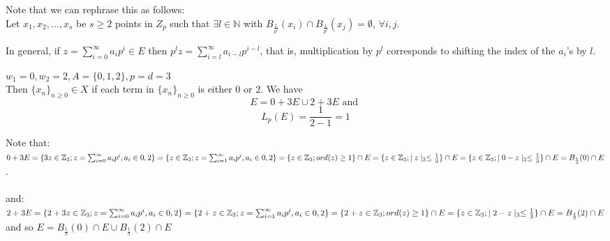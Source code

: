 \begin{framed}
Note that we can rephrase this as follows:\\ Let $x_1,x_2,\ldots,x_s$ be $s \geq 2$ points in $Z_p$ such that $\exists l \in \mathbb{N}$ with $B_{\frac{1}{p^l}}(x_i) \cap B_{\frac{1}{p^l}}(x_j) = \emptyset$, $\forall i,j$.

In general, if $z=\sum_{i=0}^\infty a_ip^i \in E$ then $p^lz =\sum_{i=l}^\infty a_{i-l}p^{i-l} $, that is, multiplication by $p^l$ corresponds to shifting the index of the $a_i$'s by $l$.
\end{framed}	
\begin{example}
$w_1=0, w_2=2,  A=\{0,1,2\}, p=d=3$\\
Then $\{x_n\}_{n\geq0} \in X$ if each term in  $\{x_n\}_{n\geq0}$ is either $0$ or $2$. We have \[E=0 + 3E \cup 2 + 3E \text{ and }\]  \[L_p(E) = \frac{1}{2-1} =1\] 

Note that:\newline $0 + 3E = \{3z \in \mathbb{Z}_3; z = \sum_{i=0}^\infty a_ip^i, a_i \in {0,2}\} =\\
\{z \in \mathbb{Z}_3; z = \sum_{i=1}^\infty a_ip^i, a_i \in {0,2}\} =\\
\{z \in \mathbb{Z}_3; ord(z) \geq 1 \} \cap E=\\
\{z \in \mathbb{Z}_3; \mid z \mid_3 \leq \frac{1}{3}\} \cap E = \\
\{z \in \mathbb{Z}_3; \mid 0- z \mid_3 \leq \frac{1}{3}\} \cap E = B_{\frac{1}{3}}(0) \cap E$.
\\\\and:\\ 
$2 + 3E = \{2 + 3z \in \mathbb{Z}_3; z = \sum_{i=0}^\infty a_ip^i, a_i \in {0,2}\} =\\
\{2 + z \in \mathbb{Z}_3; z = \sum_{i=1}^\infty a_ip^i, a_i \in {0,2}\} =\\
\{2 + z \in \mathbb{Z}_3; ord(z) \geq 1 \} \cap E=\\
\{z \in \mathbb{Z}_3; \mid 2 - z \mid_3 \leq \frac{1}{3}\} \cap E = \\
B_{\frac{1}{3}}(2) \cap E$
\\ and so $E = B_{\frac{1}{3}}(0)\cap E \cup B_{\frac{1}{3}}(2) \cap E$
\end{example}


